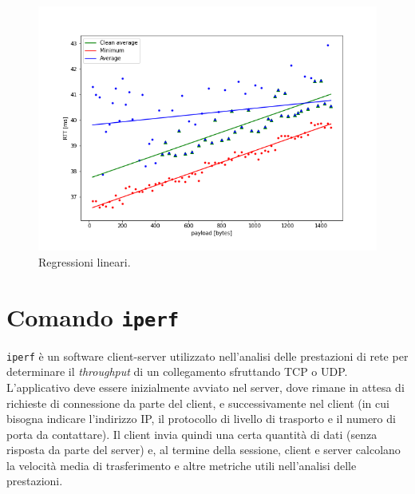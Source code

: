 \documentclass[a4paper,10pt]{article}
\begin{document}
\begin{figure}[h!]
     \centering
         \includegraphics[scale=0.4]{img/clean.png}
         \vspace{-18pt}
         \caption{Regressioni lineari.}
         \label{fig:regr}
\end{figure}

\newpage

\section{Comando \texttt{iperf}}
\texttt{iperf} è un software client-server utilizzato nell'analisi delle prestazioni di rete per determinare il \textit{throughput} di un collegamento sfruttando TCP o UDP. L'applicativo deve essere inizialmente avviato nel server, dove rimane in attesa di richieste di connessione da parte del client, e successivamente nel client (in cui bisogna indicare l'indirizzo IP, il protocollo di livello di trasporto e il numero di porta da contattare). Il client invia quindi una certa quantità di dati (senza risposta da parte del server) e, al termine della sessione, client e server calcolano la velocità media di trasferimento e altre metriche utili nell'analisi delle prestazioni. 
\end{document}
